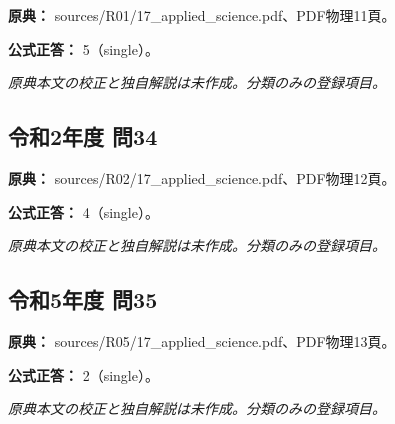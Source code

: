 \noindent\textbf{原典：} sources/R01/17\_applied\_science.pdf、PDF物理11頁。

\textbf{公式正答：} 5（single）。

\par\textit{原典本文の校正と独自解説は未作成。分類のみの登録項目。}

\subsection{令和2年度 問34}
\label{q:r02-reg-applied-34}

\noindent\textbf{原典：} sources/R02/17\_applied\_science.pdf、PDF物理12頁。

\textbf{公式正答：} 4（single）。

\par\textit{原典本文の校正と独自解説は未作成。分類のみの登録項目。}

\subsection{令和5年度 問35}
\label{q:r05-reg-applied-35}

\noindent\textbf{原典：} sources/R05/17\_applied\_science.pdf、PDF物理13頁。

\textbf{公式正答：} 2（single）。

\par\textit{原典本文の校正と独自解説は未作成。分類のみの登録項目。}
